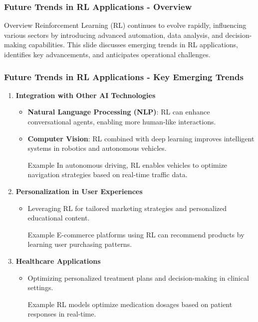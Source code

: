 \documentclass[aspectratio=169]{beamer}
\begin{document}
\begin{frame}[fragile]
    \frametitle{Future Trends in RL Applications - Overview}
    \begin{block}{Overview}
        Reinforcement Learning (RL) continues to evolve rapidly, influencing various sectors by introducing advanced automation, data analysis, and decision-making capabilities. 
        This slide discusses emerging trends in RL applications, identifies key advancements, and anticipates operational challenges.
    \end{block}
\end{frame}

\begin{frame}[fragile]
    \frametitle{Future Trends in RL Applications - Key Emerging Trends}
    \begin{enumerate}
        \item \textbf{Integration with Other AI Technologies}
            \begin{itemize}
                \item \textbf{Natural Language Processing (NLP)}: RL can enhance conversational agents, enabling more human-like interactions.
                \item \textbf{Computer Vision}: RL combined with deep learning improves intelligent systems in robotics and autonomous vehicles.
                \begin{block}{Example}
                    In autonomous driving, RL enables vehicles to optimize navigation strategies based on real-time traffic data.
                \end{block}
            \end{itemize}
        
        \item \textbf{Personalization in User Experiences}
            \begin{itemize}
                \item Leveraging RL for tailored marketing strategies and personalized educational content.
                \begin{block}{Example}
                    E-commerce platforms using RL can recommend products by learning user purchasing patterns.
                \end{block}
            \end{itemize}
        
        \item \textbf{Healthcare Applications}
            \begin{itemize}
                \item Optimizing personalized treatment plans and decision-making in clinical settings.
                \begin{block}{Example}
                    RL models optimize medication dosages based on patient responses in real-time.
                \end{block}
            \end{itemize}
        

\end{enumerate}
\end{frame}
\end{document}
